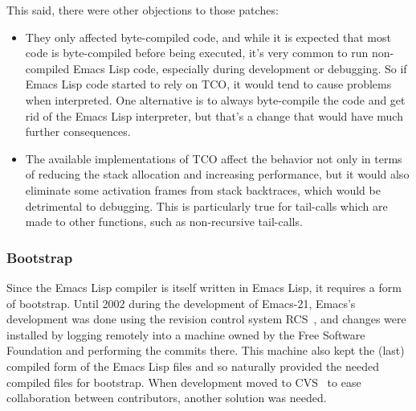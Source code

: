 \documentclass[format=acmsmall, review]{acmart}
\newcommand \Elisp {Emacs Lisp}
\begin{document}
This said, there were other objections to those patches:
\begin{itemize}
\item They only affected byte-compiled code, and while it is expected that
  most code is byte-compiled before being executed, it's very common to run
  non-compiled \Elisp{} code, especially during development or debugging.
  So if \Elisp{} code started to rely on TCO, it would tend to cause problems
  when interpreted.  One alternative is to always byte-compile the code and
  get rid of the \Elisp{} interpreter, but that's a change that would have
  much further consequences.
\item The available implementations of TCO affect the behavior not only in
  terms of reducing the stack
  allocation and increasing performance, but it would also eliminate some
  activation frames from stack backtraces, which would be detrimental to
  debugging.  This is particularly true for tail-calls which are made to
  other functions, such as non-recursive tail-calls.
\end{itemize}

\subsubsection{Bootstrap}
\label{sec:bootstrap}

Since the \Elisp{} compiler is itself written in \Elisp{}, it requires
a form of bootstrap.  Until 2002 during the development of Emacs-21, Emacs's
development was done using the revision control system RCS~\cite{Tichy85}, and
changes were installed by logging remotely into a machine owned by the
Free Software Foundation and
performing the commits there.  This machine also kept the (last) compiled
form of the \Elisp{} files and so naturally provided the needed compiled
files for bootstrap.  When development moved to CVS~\cite{Berliner90} to ease
collaboration between contributors, another solution was needed.
\end{document}
